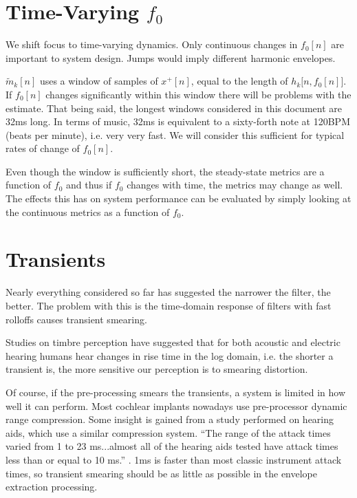 \documentclass [11pt, proquest,oneside] {ganter_thesis}[2015/03/03]
\begin{document}

\section{Time-Varying $f_0$}

We shift focus to time-varying dynamics.  Only continuous changes in $f_0[n]$ are important to system design.  Jumps would imply different harmonic envelopes.

$\tilde{m}_k[n]$ uses a window of samples of $x^+[n]$, equal to the length of $h_k\big[n,f_0[n]\big]$.  If $f_0[n]$ changes significantly within this window there will be problems with the estimate.  That being said, the longest windows considered in this document are 32ms long.  In terms of music, 32ms is equivalent to a sixty-forth note at 120BPM (beats per minute), i.e. very very fast.  We will consider this sufficient for typical rates of change of $f_0[n]$.

Even though the window is sufficiently short, the steady-state metrics are a function of $f_0$ and thus if $f_0$ changes with time, the metrics may change as well.  The effects this has on system performance can be evaluated by simply looking at the continuous metrics as a function of $f_0$.

\section{Transients}\label{section:transients}
Nearly everything considered so far has suggested the narrower the filter, the better.  The problem with this is the time-domain response of filters with fast rolloffs causes transient smearing.

Studies on timbre perception \cite{kong2011temporal} have suggested that for both acoustic and electric hearing humans hear changes in rise time in the log domain, i.e. the shorter a transient is, the more sensitive our perception is to smearing distortion.

Of course, if the pre-processing smears the transients, a system is limited in how well it can perform.  Most cochlear implants nowadays use pre-processor dynamic range compression.  Some insight is gained from a study performed on hearing aids, which use a similar compression system.  ``The range of the attack times varied from 1 to 23 ms...almost all of the hearing aids tested have attack times less than or equal to 10 ms.'' \cite{burnett1977attack}.  1ms is faster than most classic instrument attack times, so transient smearing should be as little as possible in the envelope extraction processing.
\end{document}
